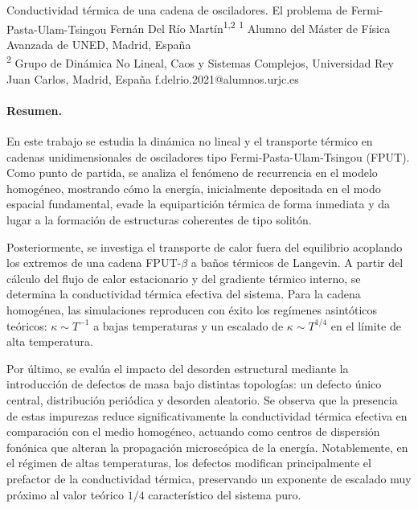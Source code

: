 \documentclass[11pt,a4paper]{article}
\begin{document}
\begin{sincabstract}
{Conductividad térmica de una cadena de osciladores. El problema de Fermi-Pasta-Ulam-Tsingou}
{Fernán Del Río Martín\textsuperscript{1,2}}
{\textsuperscript{1} Alumno del Máster de Física Avanzada de UNED, Madrid, España\\
\textsuperscript{2} Grupo de Dinámica No Lineal, Caos y Sistemas Complejos, Universidad Rey Juan Carlos, Madrid, España}
{f.delrio.2021@alumnos.urjc.es}

\paragraph{Resumen.}
En este trabajo se estudia la dinámica no lineal y el transporte térmico en cadenas unidimensionales de osciladores tipo Fermi-Pasta-Ulam-Tsingou (FPUT). Como punto de partida, se analiza el fenómeno de recurrencia en el modelo homogéneo, mostrando cómo la energía, inicialmente depositada en el modo espacial fundamental, evade la equipartición térmica de forma inmediata y da lugar a la formación de estructuras coherentes de tipo solitón.

Posteriormente, se investiga el transporte de calor fuera del equilibrio acoplando los extremos de una cadena FPUT-$\beta$ a baños térmicos de Langevin. A partir del cálculo del flujo de calor estacionario y del gradiente térmico interno, se determina la conductividad térmica efectiva del sistema. Para la cadena homogénea, las simulaciones reproducen con éxito los regímenes asintóticos teóricos: $\kappa\sim T^{-1}$ a bajas temperaturas y un escalado de $\kappa\sim T^{1/4}$ en el límite de alta temperatura.

Por último, se evalúa el impacto del desorden estructural mediante la introducción de defectos de masa bajo distintas topologías: un defecto único central, distribución periódica y desorden aleatorio. Se observa que la presencia de estas impurezas reduce significativamente la conductividad térmica efectiva en comparación con el medio homogéneo, actuando como centros de dispersión fonónica que alteran la propagación microscópica de la energía. Notablemente, en el régimen de altas temperaturas, los defectos modifican principalmente el prefactor de la conductividad térmica, preservando un exponente de escalado muy próximo al valor teórico $1/4$ característico del sistema puro.

\end{sincabstract}
\end{document}
